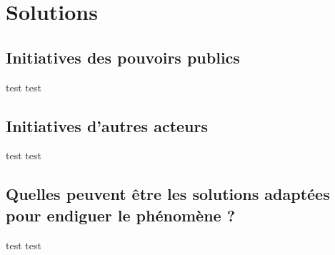 \section{Solutions}

\subsection{Initiatives des pouvoirs publics}

\begin{frame}{test}
test
\end{frame}

\subsection{Initiatives d'autres acteurs}

\begin{frame}{test}
test
\end{frame}

\subsection{Quelles peuvent être les solutions adaptées pour endiguer le phénomène ?}

\begin{frame}{test}
test
\end{frame}